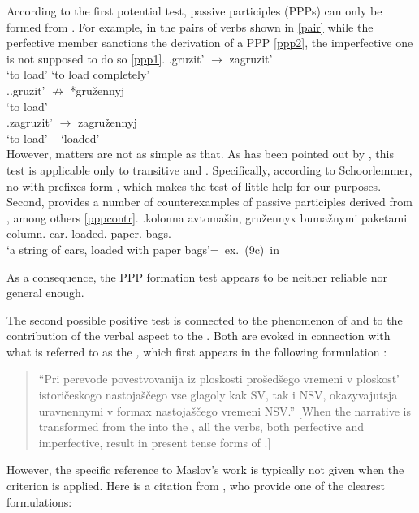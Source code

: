 According to the first potential test,  passive participles (PPPs) can only be formed from . For example, in the pairs of verbs shown in \ref{pair} while the perfective member sanctions the derivation of a PPP \ref{ppp2}, the imperfective one is not supposed to do so \ref{ppp1}.
\exg.\label{pair}{gruzit'\textsuperscript{\IPF}} {$\rightarrow$} zagruzit'\textsuperscript{\PF}\\
{`to load'} {} {`to load completely'}\\

\ex.\ag.\label{ppp1}gruzit'\textsuperscript{\IPF} $\nrightarrow$ *gru\v{z}ennyj\\
{`to load'} {~} {~}\\
\bg.\label{ppp2}zagruzit'\textsuperscript{\PF} {$\rightarrow$} zagru\v{z}ennyj\\
{`to load'} {~} {`loaded'}\\

However, matters are not as simple as that. As has been pointed out by \citet{Schoorlemmer:95}, this test is applicable only to transitive and . Specifically, according to Schoorlemmer, no  with  prefixes form , which makes the test of little help for our purposes. Second, \citet{Romanova:06} provides a number of counterexamples of  passive participles derived from , among others \ref{pppcontr}.
\exg.\label{pppcontr}kolonna avtoma\v{s}in, gru\v{z}ennyx buma\v{z}nymi paketami \\
column. car. loaded. paper. bags.\\
\trans `a string of cars, loaded with paper bags'\hfill\hbox{= ex. (9c) in \citet[5]{Romanova:06}}

As a consequence, the PPP formation test appears to be neither reliable nor general enough.

The second possible positive test is connected to the phenomenon of  and to the contribution of the verbal aspect to the . Both are evoked in connection with what is referred to as the \textit{,} which first appears in the following formulation \citep[][76--77]{Maslov:04}: 
\begin{quote}
``Pri perevode povestvovanija iz ploskosti pro\v{s}ed\v{s}ego vremeni v ploskost' istori\v{c}eskogo nastoja\v{s}\v{c}ego vse glagoly kak SV, tak i NSV, okazyvajutsja uravnennymi v formax nastoja\v{s}\v{c}ego vremeni NSV.'' [When the narrative is transformed from the  into the , all the verbs, both perfective and imperfective, result in present tense forms of .] 
\end{quote}
However, the specific reference to Maslov's work is typically not given when the criterion is applied. Here is a citation from \citet[1]{Mikaelian:07}, who provide one of the clearest formulations:

